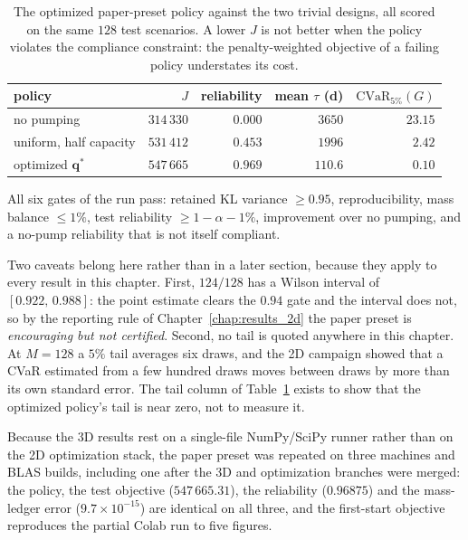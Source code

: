 \begin{table}[t]
  \centering
  \caption{The optimized paper-preset policy against the two trivial designs, all
  scored on the same $128$ test scenarios. A lower $J$ is not better when the
  policy violates the compliance constraint: the penalty-weighted objective of a
  failing policy understates its cost.}
  \label{tab:3d-baselines}
  \begin{tabular}{@{}lrrrr@{}}
    \toprule
    policy & $J$ & reliability & mean $\tau$ (d) & $\mathrm{CVaR}_{5\%}(G)$ \\
    \midrule
    no pumping & $314\,330$ & $0.000$ & $3650$ & $23.15$ \\
    uniform, half capacity & $531\,412$ & $0.453$ & $1996$ & $2.42$ \\
    optimized $\mathbf{q}^*$ & $547\,665$ & $0.969$ & $110.6$ & $0.10$ \\
    \bottomrule
  \end{tabular}
\end{table}

All six gates of the run pass: retained KL variance $\ge 0.95$,
reproducibility, mass balance $\le 1\%$, test reliability $\ge 1-\alpha-1\%$,
improvement over no pumping, and a no-pump reliability that is not itself
compliant.

Two caveats belong here rather than in a later section, because they apply to
every result in this chapter. First, $124/128$ has a Wilson interval of
$[0.922,\,0.988]$: the point estimate clears the $0.94$ gate and the interval
does not, so by the reporting rule of Chapter~\ref{chap:results_2d} the paper
preset is \emph{encouraging but not certified}. Second, no tail is quoted
anywhere in this chapter. At $M=128$ a $5\%$ tail averages six draws, and the
2D campaign showed that a CVaR estimated from a few hundred draws moves between
draws by more than its own standard error. The tail column of
Table~\ref{tab:3d-baselines} exists to show that the optimized policy's tail is
near zero, not to measure it.

Because the 3D results rest on a single-file NumPy/SciPy runner rather than on
the 2D optimization stack, the paper preset was repeated on three machines and
BLAS builds, including one after the 3D and optimization branches were merged:
the policy, the test objective ($547\,665.31$), the reliability ($0.96875$) and
the mass-ledger error ($9.7\times10^{-15}$) are identical on all three, and the
first-start objective reproduces the partial Colab run to five figures.

